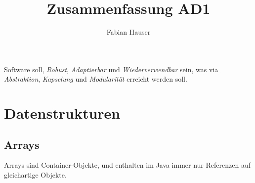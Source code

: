 

\title{Zusammenfassung AD1}
\author{Fabian Hauser}
 

\maketitle

Software soll, \emph{Robust}, \emph{Adaptierbar} und \emph{Wiederverwendbar} sein, was via \emph{Abstraktion}, \emph{Kapselung} und \emph{Modularität} erreicht werden soll.

\section{Datenstrukturen}
\subsection{Arrays}

Arrays sind Container-Objekte, und enthalten im Java immer nur Referenzen auf gleichartige Objekte.



